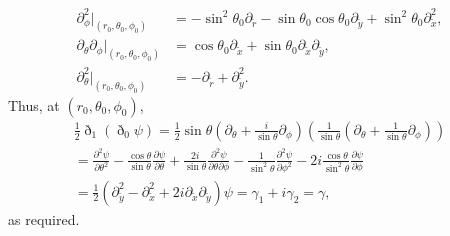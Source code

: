 \documentclass[11pt]{article} %
\begin{document}
\begin{align*}
    \partial_\phi^2|_{(r_0,\theta_0,\phi_0)}&=-\sin^2\theta_0\partial_{\tilde r}-\sin\theta_0\cos\theta_0\partial_{\tilde y}+\sin^2\theta_0\partial^2_{\tilde x},\\
    \partial_\theta\partial_\phi|_{(r_0,\theta_0,\phi_0)}&=\cos\theta_0\partial_{\tilde x}+\sin\theta_0\partial_{\tilde x}\partial_{\tilde y},\\
    \partial_\theta^2|_{(r_0,\theta_0,\phi_0)}&=-\partial_{\tilde r}+\partial^2_{\tilde y}.
\end{align*}
Thus, at $(r_0, \theta_0, \phi_0)$,
\begin{gather*}
    \frac{1}{2}\eth_1(\eth_0\psi) = \frac{1}{2}\sin\theta(\partial_\theta+\frac{i}{\sin\theta}\partial_\phi)(\frac{1}{\sin\theta}(\partial_\theta+\frac{1}{\sin\theta}\partial_\phi))\\
    =\frac{\partial^2 \psi}{\partial \theta^2} - \frac{\cos\theta}{\sin\theta} \frac{\partial \psi}{\partial \theta} + \frac{2 i}{\sin\theta} \frac{\partial^2 \psi}{\partial \theta \partial \phi} - \frac{1}{\sin^2\theta} \frac{\partial^2 \psi}{\partial \phi^2} - 2 i \frac{\cos\theta}{\sin^2\theta} \frac{\partial \psi}{\partial \phi}\\
    =\frac{1}{2}(\partial_{\tilde y}^2 - \partial_{\tilde x}^2 + 2i\partial_{\tilde x}\partial_{\tilde y})\psi
    =\gamma_1 + i\gamma_2 = \gamma,
\end{gather*}
as required.
\end{document}
